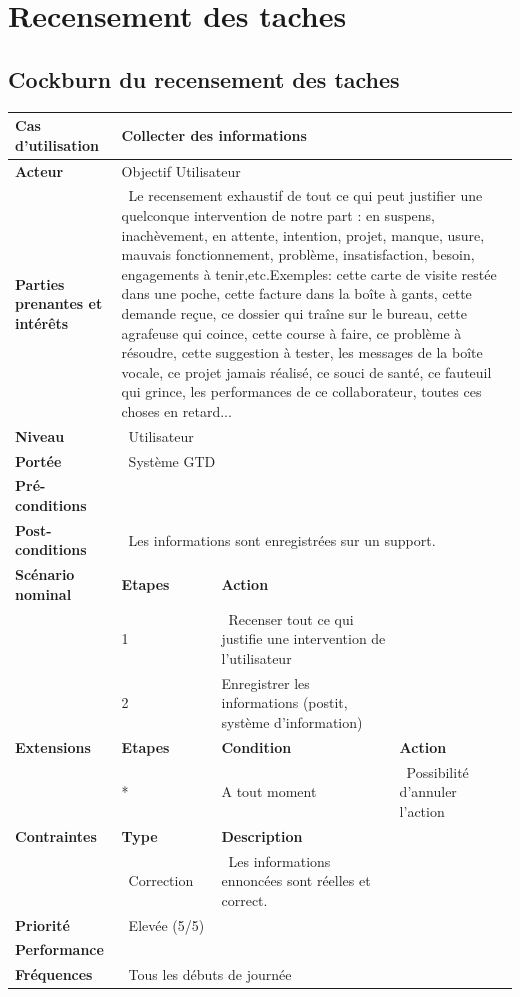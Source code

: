 \section {Recensement des taches}
\subsection*{Cockburn du recensement des taches}
\begin{tabular}{|p{1.1in}|p{1.1in}|p{2.0in}|p{1.5in}|} \hline 
\textbf{Cas d'utilisation} & \multicolumn{3}{|p{3.2in}|}{Collecter des informations} \\ \hline 
\textbf{Acteur} & \multicolumn{3}{|p{3.2in}|}{Objectif Utilisateur} \\ \hline 
\textbf{Parties prenantes et intérêts} & \multicolumn{3}{|p{5in}|}{~Le recensement exhaustif 
de tout ce qui peut justifier une quelconque intervention de notre part : en suspens, 
inachèvement, en attente, intention, projet, manque, usure, mauvais fonctionnement, 
problème, insatisfaction, besoin, engagements à tenir,etc.\newline Exemples: cette 
carte de visite restée dans une poche, cette facture dans la boîte à gants, cette 
demande reçue, ce dossier qui traîne sur le bureau, cette agrafeuse qui coince, cette 
course à faire, ce problème à résoudre, cette suggestion à tester, les messages de 
la boîte vocale, ce projet jamais réalisé, ce souci de santé, ce fauteuil qui grince, 
les performances de ce collaborateur, toutes ces choses en retard...} \\ \hline 
\textbf{Niveau} & \multicolumn{3}{|p{3.2in}|}{~Utilisateur} \\ \hline 
\textbf{Portée} & \multicolumn{3}{|p{3.2in}|}{~Système 
GTD} \\ \hline 
\textbf{Pré-conditions} & \multicolumn{3}{|p{3.2in}|}{~} \\ \hline 
\textbf{Post-conditions} & \multicolumn{3}{|p{4.6in}|}{~Les informations sont enregistrées sur un support.} \\ \hline 
\textbf{Scénario nominal} & \textbf{Etapes} & \textbf{Action} & ~ \\ \hline 
~ & 1 & ~Recenser tout ce qui justifie une intervention de l'utilisateur~ & ~ \\ \hline 
 & 2 & Enregistrer les informations (postit, système d'information) &  \\ \hline 
\textbf{Extensions} & \textbf{Etapes} & \textbf{Condition} & \textbf{Action} \\ \hline 
~ & * & A 
tout moment & ~Possibilité d'annuler l'action \\ \hline 
\textbf{Contraintes} & \textbf{Type} & \textbf{Description} & ~ \\ \hline 
~ & ~Correction & ~Les informations ennoncées sont réelles et correct. & ~ \\ \hline 
\textbf{Priorité} & \multicolumn{3}{|p{3.2in}|}{~Elevée 
(5/5)} \\ \hline 
\textbf{Performance} & \multicolumn{3}{|p{3.2in}|}{~} \\ \hline 
\textbf{Fréquences} & \multicolumn{3}{|p{3.2in}|}{~Tous les débuts de journée} \\ \hline 
\end{tabular}
